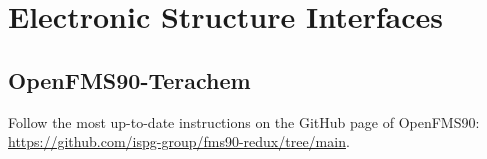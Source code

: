 \documentclass[11pt]{article}
\begin{document}
%
%
%
%
%
%
% 
%
%


\newpage \section{Electronic Structure Interfaces}
\label{elecstruc} 



\subsection{OpenFMS90-Terachem}
\label{fms90tcl} 
Follow the most up-to-date instructions on the GitHub page of OpenFMS90: \url{https://github.com/ispg-group/fms90-redux/tree/main}.
\end{document}
